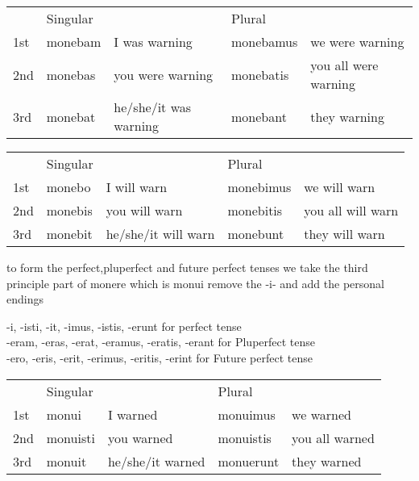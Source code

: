 \begin{center}  
  \begin{tabular}{lllll}
    \centering
    & Singular & & Plural &  \\
    1st & monebam & I was warning & monebamus & we were warning \\
    2nd & monebas & you were warning & monebatis & you all were warning \\ 
    3rd & monebat & he/she/it was warning & monebant & they warning \\
  \end{tabular}
\end{center}
\begin{center}  
  \begin{tabular}{lllll}
    \centering
    & Singular & & Plural &  \\
    1st & monebo & I will warn & monebimus & we will warn \\
    2nd & monebis & you will warn& monebitis & you all will warn\\ 
    3rd & monebit & he/she/it will warn & monebunt & they will warn\\
  \end{tabular}
\end{center}
to form the perfect,pluperfect and future perfect tenses we take the 
third principle part of monere which is monui remove the -i- and add 
the personal endings
\begin{center}
 -i, -isti, -it, -imus, -istis, -erunt for perfect tense \\
 -eram, -eras, -erat, -eramus, -eratis, -erant for Pluperfect tense \\
 -ero, -eris, -erit, -erimus, -eritis, -erint for Future perfect tense
\end{center}

\begin{center}  
  \begin{tabular}{lllll}
    \centering
    & Singular & & Plural &  \\
    1st & monui & I warned& monuimus & we warned\\
    2nd & monuisti & you warned& monuistis & you all warned\\ 
    3rd & monuit & he/she/it warned & monuerunt & they warned\\
  \end{tabular}
\end{center}

